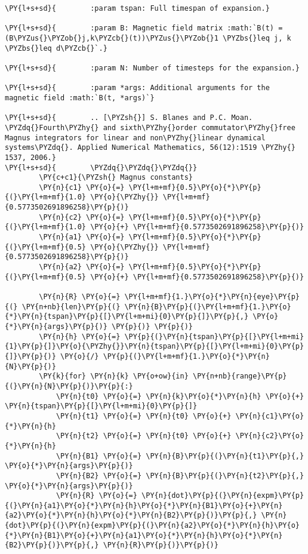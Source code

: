 \begin{Verbatim}[commandchars=\\\{\}]
\PY{l+s+sd}{        :param tspan: Full timespan of expansion.}

\PY{l+s+sd}{        :param B: Magnetic field matrix :math:`B(t) = (B\PYZus{}\PYZob{}j,k\PYZcb{}(t))\PYZus{}\PYZob{}1 \PYZbs{}leq j, k \PYZbs{}leq d\PYZcb{}`.}

\PY{l+s+sd}{        :param N: Number of timesteps for the expansion.}

\PY{l+s+sd}{        :param *args: Additional arguments for the magnetic field :math:`B(t, *args)`}

\PY{l+s+sd}{        .. [\PYZsh{}] S. Blanes and P.C. Moan. \PYZdq{}Fourth\PYZhy{} and sixth\PYZhy{}order commutator\PYZhy{}free Magnus integrators for linear and non\PYZhy{}linear dynamical systems\PYZdq{}. Applied Numerical Mathematics, 56(12):1519 \PYZhy{} 1537, 2006.}
\PY{l+s+sd}{        \PYZdq{}\PYZdq{}\PYZdq{}}
        \PY{c+c1}{\PYZsh{} Magnus constants}
        \PY{n}{c1} \PY{o}{=} \PY{l+m+mf}{0.5}\PY{o}{*}\PY{p}{(}\PY{l+m+mf}{1.0} \PY{o}{\PYZhy{}} \PY{l+m+mf}{0.5773502691896258}\PY{p}{)}
        \PY{n}{c2} \PY{o}{=} \PY{l+m+mf}{0.5}\PY{o}{*}\PY{p}{(}\PY{l+m+mf}{1.0} \PY{o}{+} \PY{l+m+mf}{0.5773502691896258}\PY{p}{)}
        \PY{n}{a1} \PY{o}{=} \PY{l+m+mf}{0.5}\PY{o}{*}\PY{p}{(}\PY{l+m+mf}{0.5} \PY{o}{\PYZhy{}} \PY{l+m+mf}{0.5773502691896258}\PY{p}{)}
        \PY{n}{a2} \PY{o}{=} \PY{l+m+mf}{0.5}\PY{o}{*}\PY{p}{(}\PY{l+m+mf}{0.5} \PY{o}{+} \PY{l+m+mf}{0.5773502691896258}\PY{p}{)}

        \PY{n}{R} \PY{o}{=} \PY{l+m+mf}{1.}\PY{o}{*}\PY{n}{eye}\PY{p}{(} \PY{n+nb}{len}\PY{p}{(} \PY{n}{B}\PY{p}{(}\PY{l+m+mf}{1.}\PY{o}{*}\PY{n}{tspan}\PY{p}{[}\PY{l+m+mi}{0}\PY{p}{]}\PY{p}{,} \PY{o}{*}\PY{n}{args}\PY{p}{)} \PY{p}{)} \PY{p}{)}
        \PY{n}{h} \PY{o}{=} \PY{p}{(}\PY{n}{tspan}\PY{p}{[}\PY{l+m+mi}{1}\PY{p}{]}\PY{o}{\PYZhy{}}\PY{n}{tspan}\PY{p}{[}\PY{l+m+mi}{0}\PY{p}{]}\PY{p}{)} \PY{o}{/} \PY{p}{(}\PY{l+m+mf}{1.}\PY{o}{*}\PY{n}{N}\PY{p}{)}
        \PY{k}{for} \PY{n}{k} \PY{o+ow}{in} \PY{n+nb}{range}\PY{p}{(}\PY{n}{N}\PY{p}{)}\PY{p}{:}
            \PY{n}{t0} \PY{o}{=} \PY{n}{k}\PY{o}{*}\PY{n}{h} \PY{o}{+} \PY{n}{tspan}\PY{p}{[}\PY{l+m+mi}{0}\PY{p}{]}
            \PY{n}{t1} \PY{o}{=} \PY{n}{t0} \PY{o}{+} \PY{n}{c1}\PY{o}{*}\PY{n}{h}
            \PY{n}{t2} \PY{o}{=} \PY{n}{t0} \PY{o}{+} \PY{n}{c2}\PY{o}{*}\PY{n}{h}
            \PY{n}{B1} \PY{o}{=} \PY{n}{B}\PY{p}{(}\PY{n}{t1}\PY{p}{,} \PY{o}{*}\PY{n}{args}\PY{p}{)}
            \PY{n}{B2} \PY{o}{=} \PY{n}{B}\PY{p}{(}\PY{n}{t2}\PY{p}{,} \PY{o}{*}\PY{n}{args}\PY{p}{)}
            \PY{n}{R} \PY{o}{=} \PY{n}{dot}\PY{p}{(}\PY{n}{expm}\PY{p}{(}\PY{n}{a1}\PY{o}{*}\PY{n}{h}\PY{o}{*}\PY{n}{B1}\PY{o}{+}\PY{n}{a2}\PY{o}{*}\PY{n}{h}\PY{o}{*}\PY{n}{B2}\PY{p}{)}\PY{p}{,} \PY{n}{dot}\PY{p}{(}\PY{n}{expm}\PY{p}{(}\PY{n}{a2}\PY{o}{*}\PY{n}{h}\PY{o}{*}\PY{n}{B1}\PY{o}{+}\PY{n}{a1}\PY{o}{*}\PY{n}{h}\PY{o}{*}\PY{n}{B2}\PY{p}{)}\PY{p}{,} \PY{n}{R}\PY{p}{)}\PY{p}{)}


\end{Verbatim}
